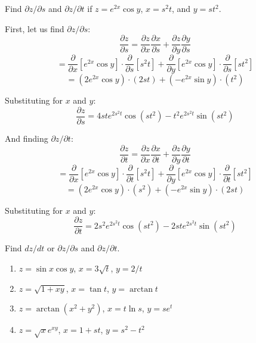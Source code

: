 \begin{Worked}
\begin{Problem}
Find $\partial z / \partial s$ and $\partial z / \partial t$ 
if $z = e^{2x} \cos{y}$, $x = s^2t$, and $y = st^2$. 
\end{Problem}
\begin{Solution}
First, let us find $\partial z / \partial s$:
$$\frac{\partial z}{\partial s} = \frac{\partial z}{\partial x} \frac{\partial 
x}{\partial s} + \frac{\partial z}{\partial y} \frac{\partial y}{\partial s}$$
$$= \frac{\partial}{\partial x} \left[ e^{2x} \cos{y} \right] \cdot \frac{
\partial}{\partial s} \left[ s^2t \right] + \frac{\partial}{\partial y} \left[ 
e^{2x} \cos{y} \right] \cdot \frac{\partial}{\partial s} \left[ st^2 \right]$$
$$= \left( 2e^{2x}\cos{y} \right) \cdot \left(2st \right) + \left(-e^{2x}
\sin{y} \right) \cdot \left( t^2 \right)$$

Substituting for $x$ and $y$:
$$\frac{\partial z}{\partial s} = 4ste^{2s^2t}\cos{ \left( st^2 \right)} - 
t^2e^{2s^2t} \sin{ \left( st^2 \right)}$$

And finding $\partial z / \partial t$:
$$\frac{\partial z}{\partial t} = \frac{\partial z}{\partial x} \frac{\partial 
x}{\partial t} + \frac{\partial z}{\partial y} \frac{\partial y}{\partial t}$$
$$= \frac{\partial}{\partial x} \left[ e^{2x} \cos{y} \right] \cdot \frac{
\partial}{\partial t} \left[ s^2 t \right] + \frac{\partial}{\partial y} 
\left[ e^{2x} \cos{y} \right] \cdot \frac{\partial}{\partial t} \left[ st^2 
\right]$$
$$= \left( 2e^{2x} \cos{y} \right) \cdot \left( s^2 \right) + \left( -e^{2x}
\sin{y} \right) \cdot \left( 2st \right)$$

Substituting for $x$ and $y$:
$$\frac{\partial z}{\partial t} = 2s^2e^{2s^2t} \cos{ \left(st^2 \right)} - 
2ste^{2s^2t}\sin{\left( st^2 \right)}$$
\end{Solution}
\end{Worked}

\begin{Exercise}[title = {The Chain Rule for Multivariable Functions}, 
label = chain]
Find $dz/dt$ or $\partial z / \partial s$ and $\partial z / \partial t$. 
\begin{enumerate}
    \item $z = \sin{x}\cos{y}$, $x = 3\sqrt{t}$, $y = 2/t$
    \item $z = \sqrt{1 + xy}$, $x = \tan{t}$, $y = \arctan{t}$
    \item $z = \arctan{\left( x^2 + y^2 \right)}$, $x = t\ln{s}$, $y = se^{t}$
    \item $z = \sqrt{x}e^{xy}$, $x = 1 + st$, $y = s^2 - t^2$
\end{enumerate}
\end{Exercise}

